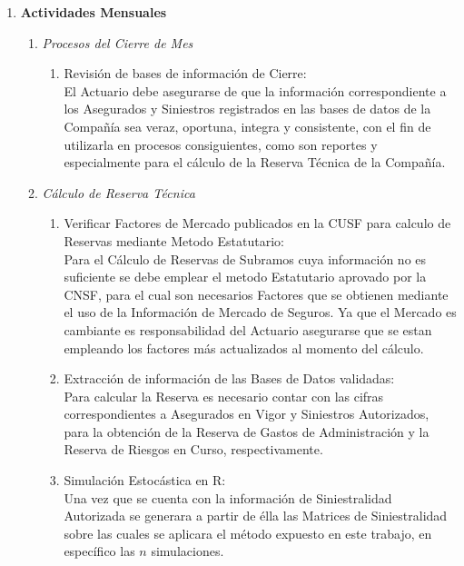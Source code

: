 \documentclass[11pt,twoside,openright,spanish]{report}
\numberwithin{equation}{chapter}
\numberwithin{figure}{chapter}
\numberwithin{table}{chapter}
\begin{document}
\begin{singlespace}
	\begin{enumerate}
		\item \textbf{Actividades Mensuales}
		\begin{enumerate}
			\item \textit{Procesos del Cierre de Mes} \begin{enumerate}
				\item Revisión de bases de información de Cierre:
				\\ \-\hspace{0.5cm} El Actuario debe asegurarse de que la información correspondiente a los Asegurados y Siniestros registrados en las bases de datos de la Compañía sea veraz, oportuna, integra y consistente, con el fin de utilizarla en procesos consiguientes, como son reportes y especialmente para el cálculo de la Reserva Técnica de la Compañía.\\
			\end{enumerate}
			\item \textit{ Cálculo de Reserva Técnica}  	\begin{enumerate}
				\item Verificar Factores de Mercado publicados en la CUSF para calculo de Reservas mediante Metodo Estatutario:\\ \-\hspace{0.5cm}
				Para el Cálculo de Reservas de Subramos cuya información no es suficiente se debe emplear el metodo Estatutario aprovado por la CNSF, para el cual son necesarios Factores que se obtienen mediante el uso de la Información de Mercado de Seguros. Ya que el Mercado es cambiante es responsabilidad del Actuario asegurarse que se estan empleando los factores más actualizados al momento del cálculo.
				\item Extracción de información de las Bases de Datos validadas:\\ \-\hspace{0.5cm}
				Para calcular la Reserva es necesario contar con las cifras correspondientes a Asegurados en Vigor y Siniestros Autorizados, para la obtención de la Reserva de Gastos de Administración y la Reserva de Riesgos en Curso, respectivamente.				
				\item Simulación Estocástica en R:\\ \-\hspace{0.5cm}
				Una vez que se cuenta con la información de Siniestralidad Autorizada se generara a partir de élla las Matrices de Siniestralidad sobre las cuales se aplicara el método expuesto en este trabajo, en específico las $n$ simulaciones.

\end{enumerate}
\end{enumerate}
\end{enumerate}
\end{singlespace}
\end{document}
